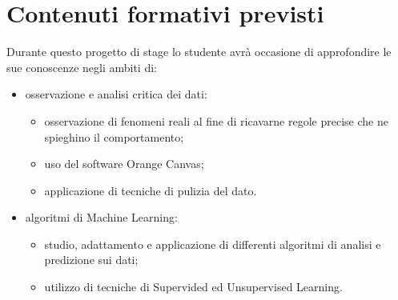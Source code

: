 \section{Contenuti formativi previsti}
Durante questo progetto di stage lo studente avrà occasione di approfondire le sue conoscenze negli ambiti di:
\begin{itemize}
\item osservazione e analisi critica dei dati:
	\begin{itemize}
	\item osservazione di fenomeni reali al fine di ricavarne regole precise che ne spieghino il comportamento;
	\item uso del software Orange Canvas;
	\item applicazione di tecniche di pulizia del dato.
	\end{itemize}
\item algoritmi di Machine Learning:
	\begin{itemize}
	\item studio, adattamento e applicazione di differenti algoritmi di analisi e predizione sui dati;
	\item utilizzo di tecniche di Supervided ed Unsupervised Learning.
	\end{itemize}
\end{itemize} 





 









